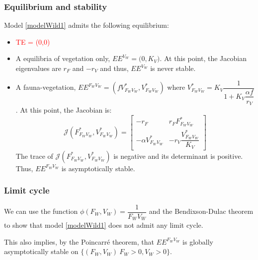 \documentclass{article}
\begin{document}
\subsubsection{Equilibrium and stability}
Model \eqref{modelWild1} admits the following equilibrium:
\begin{itemize}
\item \textcolor{red}{TE = (0,0)}
\item A equilibria of vegetation only, $EE^{V_W} = \Big(0, K_V\Big)$. At this point, the Jacobian eigenvalues are $r_F$ and $-r_V$ and thus, $EE^{V_W}$ is never stable.
\item A fauna-vegetation, $EE^{F_WV_W} = \left(fV^*_{F_WV_W}, V^*_{F_WV_W} \right)$ where $V^*_{F_WV_W} = K_V \dfrac{1}{1+K_V\dfrac{\alpha f}{r_V}}$. At this point, the Jacobian is:
\begin{equation}
\mathcal{J}(F_{F_WV_W}^*, V_{F_WV_W}^*) = \begin{bmatrix}
-r_F  & r_FF_{F_WV_W}^* \\
- \alpha V_{F_WV_W}^* & -r_V \dfrac{V_{F_WV_W}^*}{K_V}
\end{bmatrix}
\end{equation}
The trace of $\mathcal{J}(F_{F_WV_W}^*, V_{F_WV_W}^*)$ is negative and its determinant is positive. Thus, $EE^{F_WV_W}$ is asymptotically stable.
\end{itemize}

\subsubsection{Limit cycle}
We can use the function $\phi(F_W, V_W) = \dfrac{1}{F_W V_W}$ and the Bendixson-Dulac theorem to show that model \eqref{modelWild1} does not admit any limit cycle.

This also implies, by the Poincarré theorem, that $EE^{F_WV_W}$ is globally asymptotically stable on $\{(F_W, V_W) \ F_W > 0, V_W > 0\}$.


%
\end{document}
